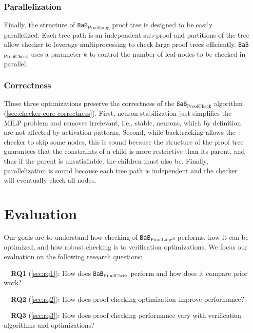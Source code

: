 \documentclass[oneside,11pt,dvipsnames]{book}
\newcommand{\prooflang}{\texttt{BaB$_{\text{ProofLang}}$}}
\newcommand{\proofcheck}{\texttt{BaB$_{\text{ProofCheck}}$}}
\begin{document}
\subsubsection{Parallelization} Finally, the structure of \prooflang{} proof tree is designed to be easily parallelized.  Each tree path is an independent sub-proof and partitions of the tree allow checker to leverage multiprocessing to check large proof trees efficiently. \proofcheck{} uses a parameter $k$ to control the number of leaf nodes to be checked in parallel.


\subsubsection{Correctness} These three optimizations preserve the correctness of the \proofcheck{} algorithm (\autoref{sec:checker-core-correctness}). First, neuron stabilization just simplifies the MILP problem and removes irrelevant, i.e., stable, neurons, which by definition are not affected by activation patterns. Second, while backtracking allows the checker to skip some nodes, this is sound because the structure of the proof tree guarantees that the constraints of a child is more restrictive than its parent, and thus if the parent is unsatisfiable, the children must also be. Finally, parallelization is sound because each tree path is independent and the checker will eventually check all nodes.



\section{Evaluation}\label{sec:evaluation}  
Our goals are to understand how checking of \prooflang{}s performs, how it can be optimized, and how robust checking is to
verification optimizations.
We focus our evaluation on the following research questions:

\noindent\mbox{~~}\textbf{RQ1} (\autoref{sec:rq1}): How does \proofcheck{} perform and how does it compare prior work? 

\noindent\mbox{~~}\textbf{RQ2} (\autoref{sec:rq2}): How does proof checking optimization improve performance?

\noindent\mbox{~~}\textbf{RQ3} (\autoref{sec:rq3}): How does proof checking performance vary with verification algorithms and optimizations?
\end{document}
